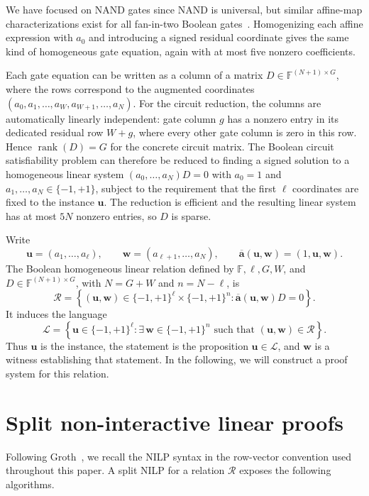 \documentclass[11pt]{article}
\theoremstyle{definition}
\newcommand{\F}{\mathbb F}
\newcommand{\cR}{\mathcal R}
\newcommand{\cL}{\mathcal L}
\begin{document}
We have focused on NAND gates since NAND is universal, but similar affine-map characterizations exist for all fan-in-two Boolean gates~\cite{DFGK14}.
Homogenizing each affine expression with $a_0$ and introducing a signed
residual coordinate gives the same kind of homogeneous gate equation, again
with at most five nonzero coefficients.

Each gate equation can be written as a column of a matrix $D\in\F^{(N+1)\times G}$, where the rows correspond to the augmented coordinates $(a_0,a_1,\ldots,a_W,a_{W+1},\ldots,a_N)$.  For the circuit reduction, the columns are automatically linearly independent: gate column $g$ has a nonzero entry in its dedicated residual row $W+g$, where every other gate column is zero in this row. Hence $\operatorname{rank}(D)=G$ for the concrete circuit matrix. The Boolean circuit satisfiability problem can therefore be reduced to finding a signed solution to a homogeneous linear system $(a_0,\ldots,a_N)D=0$ with $a_0=1$ and $a_1,\ldots,a_N\in \{-1,+1\}$, subject to the requirement that the first $\ell$ coordinates are fixed to the instance $\mathbf u$. The reduction is efficient and the resulting linear system has at most $5N$ nonzero entries, so $D$ is sparse.

Write
\[
  \mathbf u=(a_{1},\ldots,a_\ell), \qquad \mathbf w=(a_{\ell+1},\ldots,a_N),
  \qquad
  \overline{\mathbf a}(\mathbf u,\mathbf w)
  =(1,\mathbf u,\mathbf w).
\]
The Boolean homogeneous linear relation defined by $\F,\ell,G,W$, and $D\in \F^{(N+1)\times G}$, with $N=G+W$ and $n=N-\ell$, is
\[
  \cR
  =\left\{(\mathbf u,\mathbf w)\in
    \{-1,+1\}^{\ell}\times\{-1,+1\}^{n}:
    \overline{\mathbf a}(\mathbf u,\mathbf w)D=0\right\}.
\]
It induces the language
\[
  \cL
  =\left\{\mathbf u\in\{-1,+1\}^{\ell}:
    \exists\,\mathbf w\in\{-1,+1\}^{n}\text{ such that }
    (\mathbf u,\mathbf w)\in\cR\right\}.
\]
Thus $\mathbf u$ is the instance, the statement is the proposition
$\mathbf u\in\cL$, and $\mathbf w$ is a witness establishing that
statement. In the following, we will construct a proof system for this relation.



\section{Split non-interactive linear proofs}

Following Groth~\cite{Groth16}, we recall the NILP syntax in the row-vector
convention used throughout this paper.  A split NILP for a relation $\cR$
exposes the following algorithms.
\end{document}
